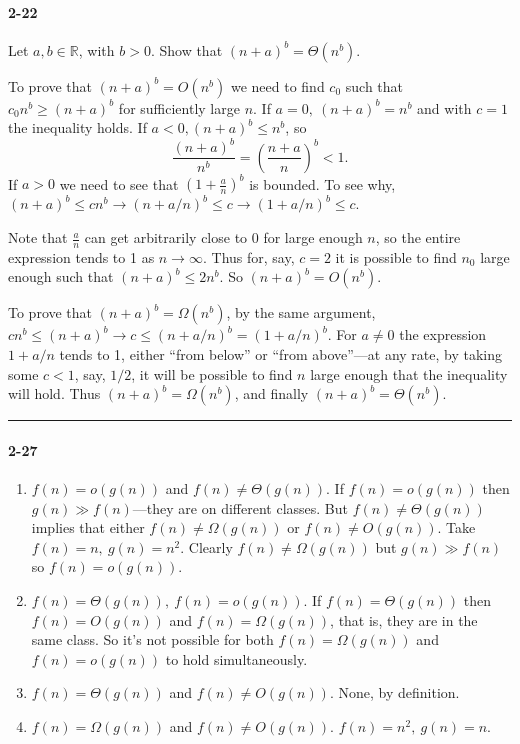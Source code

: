 \documentclass{report}
\newcommand{\R}{\mathbb{R}}
\newcommand{\okthen}{\rule[-1.4pt]{0.3em}{0.77em}}
\begin{document}
\paragraph{2-22} Let $a, b \in \R$, with $b > 0$. Show that $(n+a)^b = \Theta(n^b)$.

\smallskip

To prove that $(n+a)^b = O(n^b)$ we need to find $c_0$ such that $c_0 n^b \ge (n+a)^b$ for sufficiently large $n$. If $a=0,\ (n+a)^b = n^b$ and with $c=1$ the inequality holds. If $a<0, (n+a)^b \le n^b$, so
\[ \frac{(n+a)^b}{n^b} = \left(\frac{n+a}{n}\right)^b < 1. \]
If $a>0$ we need to see that $(1 + \frac{a}{n})^b$ is bounded. To see why, $(n+a)^b \le c n^b \to (n+a/n)^b \le c \to (1 + a/n)^b \le c$.

Note that $\frac{a}{n}$ can get arbitrarily close to 0 for large enough $n$, so the entire expression tends to 1 as $n\to\infty$. Thus for, say, $c=2$ it is possible to find $n_0$ large enough such that $(n+a)^b \le 2n^b$. So $(n+a)^b = O(n^b)$.

\smallskip

To prove that $(n+a)^b = \Omega(n^b)$, by the same argument, $c n^b \le (n+a)^b \to c \le (n+a/n)^b = (1 + a/n)^b$. For $a\ne0$ the expression $1+a/n$ tends to 1, either ``from below'' or ``from above''---at any rate, by taking some $c<1$, say, $1/2$, it will be possible to find $n$ large enough that the inequality will hold. Thus $(n+a)^b = \Omega(n^b)$, and finally $(n+a)^b = \Theta(n^b)$.\ \okthen

\paragraph{2-27}
\begin{enumerate}[label=(\alph*)]
	\item $f(n) = o(g(n))$ and $f(n)\ne\Theta(g(n))$. If $f(n) = o(g(n))$ then $g(n)\gg f(n)$---they are on different classes. But $f(n)\ne\Theta(g(n))$ implies that either $f(n)\ne\Omega(g(n))$ or $f(n)\ne O(g(n))$. Take $f(n)=n,\ g(n)=n^2$. Clearly $f(n)\ne\Omega(g(n))$ but $g(n)\gg f(n)$ so $f(n)=o(g(n))$.
	\item $f(n) = \Theta(g(n)),\ f(n) = o(g(n))$. If $f(n)=\Theta(g(n))$ then $f(n)=O(g(n))$ and $f(n)=\Omega(g(n))$, that is, they are in the same class. So it's not possible for both $f(n)=\Omega(g(n))$ and $f(n)=o(g(n))$ to hold simultaneously.
	\item $f(n)=\Theta(g(n))$ and $f(n)\ne O(g(n))$. None, by definition.
	\item $f(n)=\Omega(g(n))$ and $f(n)\ne O(g(n))$. $f(n)=n^2,\ g(n)=n$.
\end{enumerate}
\end{document}
